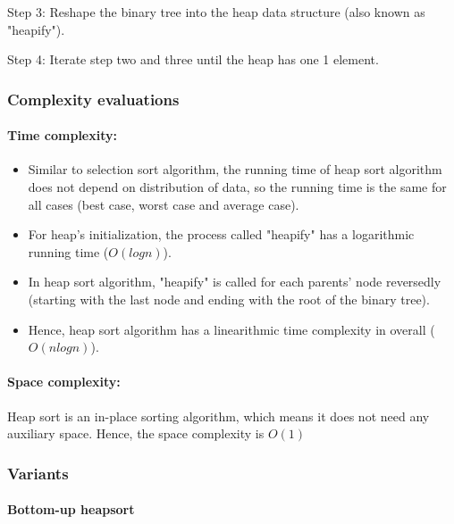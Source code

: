 \documentclass{article}
\newcommand\tab[1][0.5cm]{\hspace*{#1}}
\begin{document}
Step 3: Reshape the binary tree into the heap data structure (also known as "heapify").
\smallskip

Step 4: Iterate step two and three until the heap has one 1 element.

\subsubsection{Complexity evaluations}

\paragraph{\tab Time complexity:}

\begin{itemize}
    \item Similar to selection sort algorithm, the running time of heap sort algorithm does not depend on distribution of data, so the running time is the same for all cases (best case, worst case and average case).

    \item For heap's initialization, the process called "heapify" has a logarithmic running time ($O(logn)$).
    
    \item In heap sort algorithm, "heapify" is called for each parents' node reversedly (starting with the last node and ending with the root of the binary tree).
    
    \item Hence, heap sort algorithm has a linearithmic time complexity in overall ($O(nlogn)$).
\end{itemize}

\paragraph{\tab Space complexity:}

Heap sort is an in-place sorting algorithm, which means it does not need any auxiliary space. Hence, the space complexity is $O(1)$ 

\subsubsection{Variants}

\paragraph{Bottom-up heapsort}
\end{document}
